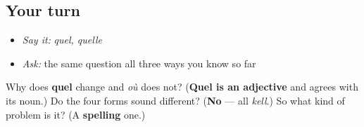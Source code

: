 \subsection*{Your turn}
\begin{itemize}
\raggedright
  \item \emph{Say it:} \emph{quel, quelle}
  \item \emph{Ask:} the same question all three ways you know so far
\end{itemize}

\begin{tcolorbox}[breakable,colback=teal!4,colframe=teal!35!black,title={Before you move on}]
Why does \textbf{quel} change and \emph{où} does not? (\textbf{Quel is an adjective} and agrees with its noun.) Do the four forms sound different? (\textbf{No} — all \emph{kell}.) So what kind of problem is it? (A \textbf{spelling} one.)
\end{tcolorbox}
